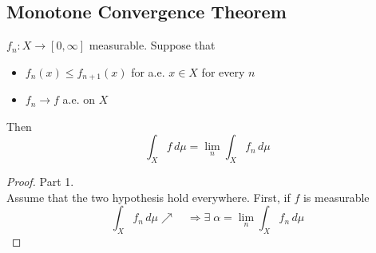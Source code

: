 \subsection{Monotone Convergence Theorem}
\begin{theorem}
    \(f_n:X\to \left[0, \infty\right]\) measurable. Suppose that 
    \begin{itemize}
        \item \(f_n(x) \leq f_{n+1}(x)\) for a.e. \(x \in X\) for every \(n\)
        \item \(f_n \to f \) a.e. on \(X\)
    \end{itemize} 
    Then \[ \int_X f \, d\mu = \lim_n \int_X f_n \, d\mu\]
\end{theorem}
\begin{proof}
    Part 1. \\
    Assume that the two hypothesis hold everywhere. First, if \(f\) is measurable 
    \[
        \int_X f_n \, d\mu \nearrow \quad \Rightarrow \exists \; \alpha = \lim_n \int_X f_n \, d\mu
    \]
    

\end{proof}
